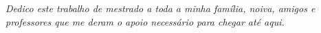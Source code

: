 \begin{dedicatoria}
   \vspace*{\fill}
   \centering
   \noindent
   \textit{Dedico este trabalho de mestrado a toda a minha família, noiva, amigos e \\
   professores que me deram o apoio necessário para chegar até aqui.} \vspace*{\fill}
\end{dedicatoria}
